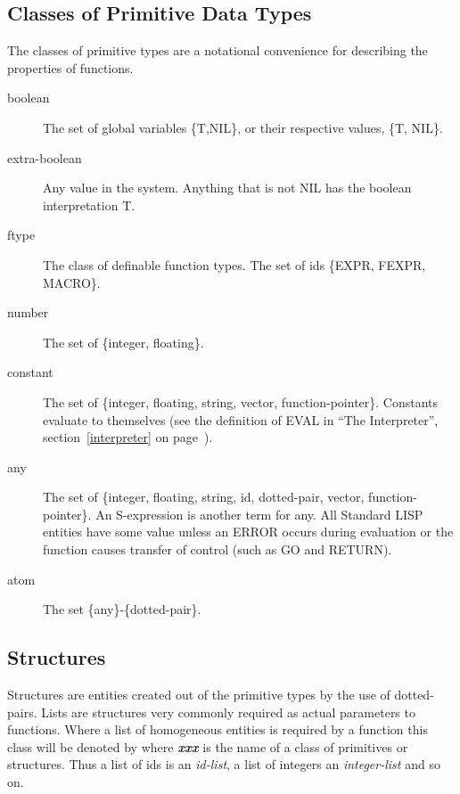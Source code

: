\subsection{Classes of Primitive Data Types}
\label{pclasses}
The classes of primitive types are a notational convenience for
describing the properties of functions.


\begin{description}
\item[boolean]  The set of global variables \{T,NIL\},
or their respective values, \{T, NIL\}.  

\item[extra-boolean]  Any value in the system.
Anything that is not NIL  has the boolean
interpretation T. 

\item[ftype]  The class of definable function types. The
set of ids \{EXPR, FEXPR, MACRO\}.  

\item[number]  The set of \{integer, floating\}.

\item[constant]  The set of \{integer, floating,
string, vector, function-pointer\}. Constants evaluate to themselves
(see the definition of EVAL in ``The Interpreter'',
section~\ref{interpreter} on page~\pageref{interpreter}). 


\item[any]  The set of \{integer, floating, string, id,
dotted-pair, vector, function-pointer\}. An S-expression is another
term for any. All Standard LISP entities have some value unless an
ERROR occurs during evaluation or the function causes transfer of
control (such as GO and RETURN).


\item[atom]  The set \{any\}-\{dotted-pair\}.
\end{description}

\subsection{Structures}
 
Structures are entities created out of the primitive types by the use
of dotted-pairs. Lists are structures very commonly required as actual
parameters to functions. Where a list of homogeneous entities is
required by a function this class will be denoted by
 where {\bf \em xxx} is the name of a class of primitives
or structures. Thus a list of ids is an {\em id-list}, a list of
integers an {\em integer-list} and so on. 

